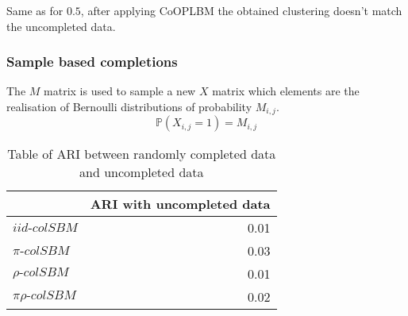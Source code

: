 Same as for \(0.5\), after applying CoOPLBM the obtained clustering
doesn't match the uncompleted data.

\hypertarget{sample-based-completions}{%
\subsubsection{Sample based
completions}\label{sample-based-completions}}

The \(M\) matrix is used to sample a new \(X\) matrix which elements are
the realisation of Bernoulli distributions of probability \(M_{i,j}\).
\[\mathbb{P}(X_{i,j} = 1) = M_{i,j} \]

\begin{table}[h!]

\caption{\label{tab:random_ARI}\label{tab:ari-table-random-completed} Table of ARI between
  randomly completed data and uncompleted data}
\centering
\begin{tabular}[t]{lr}
\toprule
  & ARI with uncompleted data\\
\midrule
$iid\text{-}colSBM$ & 0.01\\
$\pi\text{-}colSBM$ & 0.03\\
$\rho\text{-}colSBM$ & 0.01\\
$\pi\rho\text{-}colSBM$ & 0.02\\
\bottomrule
\end{tabular}
\end{table}
